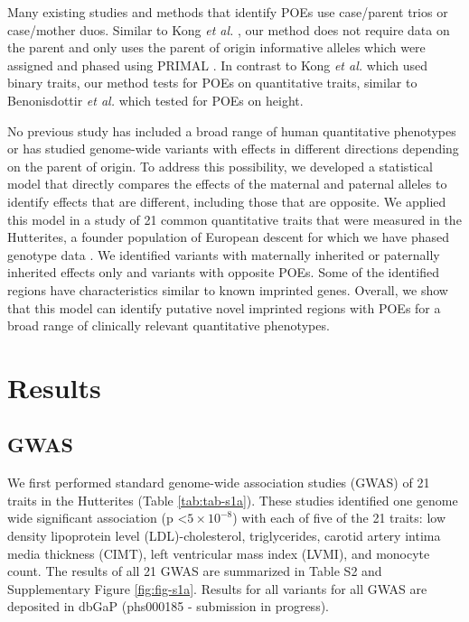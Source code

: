 Many existing studies and methods that identify POEs use case/parent trios or case/mother duos\citep{Chuang:2017kp,Howey:2012hj,Ainsworth:2010bp,Weinberg:1999km,Weinberg:1998cf}. Similar to Kong \emph{et al.} \citep{Kong:2009kk}, our method does not require data on the parent and only uses the parent of origin informative alleles which were assigned and phased using PRIMAL \citep{Livne2015}.  In contrast to Kong \emph{et al.} \citep{Kong:2009kk} which used binary traits, our method tests for POEs on quantitative traits, similar to Benonisdottir \emph{et al.} \citep{Benonisdottir:2016dz} which tested for POEs on height.

No previous study has included a broad range of human quantitative phenotypes or has studied genome-wide variants with effects in different directions depending on the parent of origin. To address this possibility, we developed a statistical model that directly compares the effects of the maternal and paternal alleles to identify effects that are different, including those that are opposite. We applied this model in a study of 21 common quantitative traits that were measured in the Hutterites, a founder population of European descent for which we have phased genotype data \citep{Livne2015}. We identified variants with maternally inherited or paternally inherited effects only and variants with opposite POEs. Some of the identified regions have characteristics similar to known imprinted genes. Overall, we show that this model can identify putative novel imprinted regions with POEs for a broad range of clinically relevant quantitative phenotypes.

\section{Results}\label{ch02-results}

\subsection{GWAS}\label{GWAS Results}
We first performed standard genome-wide association studies (GWAS) of 21 traits in the Hutterites (Table \ref{tab:tab-s1a}). These studies identified one genome wide significant association (p \textless $5 \times10^{-8} $) with each of five of the 21 traits: low density lipoprotein level (LDL)-cholesterol, triglycerides, carotid artery intima media thickness (CIMT), left ventricular mass index (LVMI), and monocyte count. The results of all 21 GWAS are summarized in Table S2 and Supplementary Figure \ref{fig:fig-s1a}. Results for all variants for all GWAS are deposited in dbGaP (phs000185 - submission in progress).

